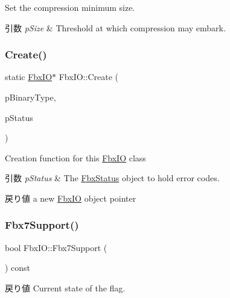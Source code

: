 Set the compression minimum size. 
\begin{DoxyParams}{引数}
{\em p\+Size} & Threshold at which compression may embark. \\
\hline
\end{DoxyParams}
\mbox{\label{class_fbx_i_o_a4f769569a424543d247289687b9b74bd}} 
\subsubsection{\texorpdfstring{Create()}{Create()}}
{\footnotesize\ttfamily static \hyperlink{class_fbx_i_o}{Fbx\+IO}$\ast$ Fbx\+I\+O\+::\+Create (\begin{DoxyParamCaption}\item[{\hyperlink{class_fbx_i_o_ad0532f36367fa6b750993000dfb8ed1e}{Binary\+Type}}]{p\+Binary\+Type,  }\item[{\hyperlink{class_fbx_status}{Fbx\+Status} \&}]{p\+Status }\end{DoxyParamCaption})\hspace{0.3cm}{\ttfamily [static]}}

Creation function for this \hyperlink{class_fbx_i_o}{Fbx\+IO} class 
\begin{DoxyParams}{引数}
{\em p\+Status} & The \hyperlink{class_fbx_status}{Fbx\+Status} object to hold error codes. \\
\hline
\end{DoxyParams}
\begin{DoxyReturn}{戻り値}
a new \hyperlink{class_fbx_i_o}{Fbx\+IO} object pointer 
\end{DoxyReturn}
\mbox{\label{class_fbx_i_o_a8aec1669dd3e06d2b77e861dde5c328b}} 
\subsubsection{\texorpdfstring{Fbx7\+Support()}{Fbx7Support()}\hspace{0.1cm}{\footnotesize\ttfamily [1/2]}}
{\footnotesize\ttfamily bool Fbx\+I\+O\+::\+Fbx7\+Support (\begin{DoxyParamCaption}{ }\end{DoxyParamCaption}) const}

\begin{DoxyReturn}{戻り値}
Current state of the flag. 
\end{DoxyReturn}
\mbox{\label{class_fbx_i_o_a8a5651ec131b0226da71e6ccbc3d3e48}} 
